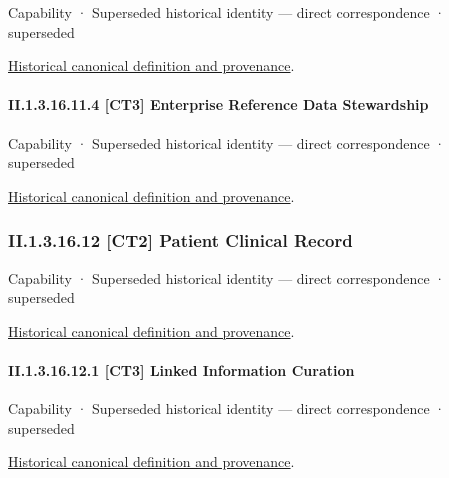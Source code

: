 \label{element:7ae95677a00346f18a0ba01522a20153}
{\small Capability · Superseded historical identity — direct correspondence · superseded}\par
\href{../../../../continuum/strategy/capability/7ae95677a00346f18a0ba01522a20153.md}{Historical canonical definition and provenance}.\par
\paragraph*{II.1.3.16.11.4 [CT3] Enterprise Reference Data Stewardship}
\label{navigation:II.1.3.16.11.4}

\label{element:fd9f3239fdb64ea687825b66bb4d1f17}
{\small Capability · Superseded historical identity — direct correspondence · superseded}\par
\href{../../../../continuum/strategy/capability/fd9f3239fdb64ea687825b66bb4d1f17.md}{Historical canonical definition and provenance}.\par
\subsubsection*{II.1.3.16.12 [CT2] Patient Clinical Record}
\label{navigation:II.1.3.16.12}

\label{element:2e4de521bda24ad7b0ea64ae535b7f84}
{\small Capability · Superseded historical identity — direct correspondence · superseded}\par
\href{../../../../continuum/strategy/capability/2e4de521bda24ad7b0ea64ae535b7f84.md}{Historical canonical definition and provenance}.\par
\paragraph*{II.1.3.16.12.1 [CT3] Linked Information Curation}
\label{navigation:II.1.3.16.12.1}

\label{element:9d0925bb39664a5985cacf3cea7442d1}
{\small Capability · Superseded historical identity — direct correspondence · superseded}\par
\href{../../../../continuum/strategy/capability/9d0925bb39664a5985cacf3cea7442d1.md}{Historical canonical definition and provenance}.\par
